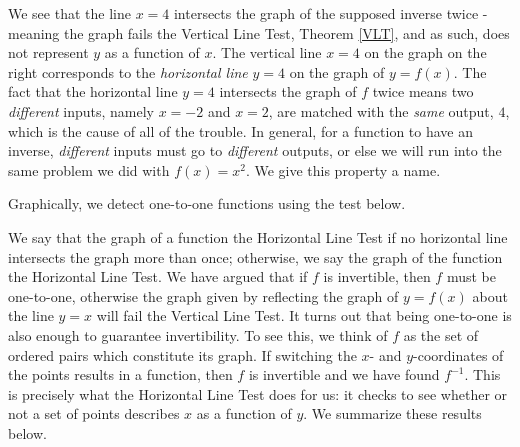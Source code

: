 We see that the line $x=4$ intersects the graph of the supposed inverse twice - meaning the graph fails the Vertical Line Test, Theorem \ref{VLT}, and as such, does not represent $y$ as a function of $x$.  The vertical line $x=4$ on the graph on the right corresponds to the \textit{horizontal line} $y=4$ on the graph of $y=f(x)$.  The fact that the horizontal line $y=4$ intersects the graph of $f$ twice means two \textit{different} inputs, namely $x=-2$ and $x=2$, are matched with the \textit{same} output, $4$, which is the cause of all of the trouble.  In general, for a function to have an inverse, \textit{different} inputs must go to \textit{different} outputs, or else we will run into the same problem we did with $f(x) = x^2$.  We give this property a name.

\smallskip


\smallskip

Graphically, we detect one-to-one functions using the test below.

\smallskip


\smallskip

We say that the graph of a function  the Horizontal Line Test  if no horizontal line intersects the graph more than once; otherwise, we say the graph of the function  the Horizontal Line Test.  We have argued that if $f$ is invertible, then $f$ must be one-to-one, otherwise the graph given by reflecting the graph of $y = f(x)$ about the line $y = x$ will fail the Vertical Line Test. It turns out that being one-to-one is also enough to guarantee invertibility.  To see this, we think of $f$ as the set of ordered pairs which constitute its graph.  If switching the $x$- and $y$-coordinates of the points results in a function, then $f$ is invertible and we have found $f^{-1}$. This is precisely what the Horizontal Line Test does for us:  it checks to see whether or not a set of points describes $x$ as a function of $y$.  We summarize these results below.
  
